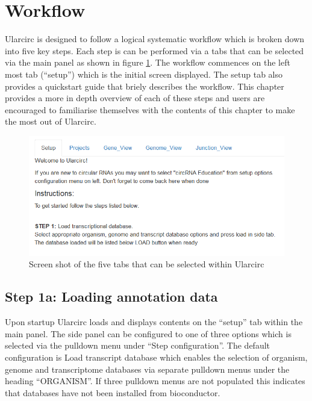 \documentclass[12pt]{article}\usepackage[]{graphicx}\usepackage[]{color}
\begin{document}
\section{Workflow} \label{sec:workflow}
Ularcirc is designed to follow a logical systematic workflow which is broken down into five key steps. Each step is can be performed  via a tabs that can be selected via the main panel as shown in figure \ref{fig:UlarcircTabs}. The workflow commences on the left most tab (``setup'') which is  the initial screen displayed. The setup tab also  provides a quickstart guide that briely describes the workflow. This chapter provides a more in depth overview of each of these steps and users are encouraged to familiarise themselves with the contents of this chapter to make the most out of Ularcirc.

\begin{figure}[h]
  \includegraphics[width=\linewidth,frame]{MainPanelTabs}
  \caption { Screen shot of the five tabs that can be selected within Ularcirc }
  \label{fig:UlarcircTabs}
\end{figure}
\subsection{Step 1a: Loading annotation data} \label{sec:Step1a}
Upon startup Ularcirc loads and displays contents on the ``setup'' tab within the main panel. The side panel can be configured to one of three options which is selected via the pulldown menu under ``Step configuration''. The default configuration  is Load transcript database which enables the selection of organism, genome and transcriptome databases via separate pulldown menus under the heading ``ORGANISM''. If three pulldown menus are not populated this indicates that databases have not been installed from bioconductor.
\end{document}
